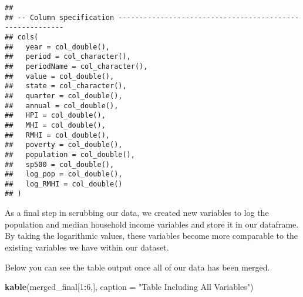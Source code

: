 \documentclass[
]{article}
\newenvironment{Shaded}{\begin{snugshade}}{\end{snugshade}}
\newcommand{\CommentTok}[1]{\textcolor[rgb]{0.56,0.35,0.01}{\textit{#1}}}
\newcommand{\DataTypeTok}[1]{\textcolor[rgb]{0.13,0.29,0.53}{#1}}
\newcommand{\DecValTok}[1]{\textcolor[rgb]{0.00,0.00,0.81}{#1}}
\newcommand{\KeywordTok}[1]{\textcolor[rgb]{0.13,0.29,0.53}{\textbf{#1}}}
\newcommand{\NormalTok}[1]{#1}
\newcommand{\OperatorTok}[1]{\textcolor[rgb]{0.81,0.36,0.00}{\textbf{#1}}}
\newcommand{\StringTok}[1]{\textcolor[rgb]{0.31,0.60,0.02}{#1}}
\begin{document}
\begin{verbatim}
## 
## -- Column specification ---------------------------------------------------------
## cols(
##   year = col_double(),
##   period = col_character(),
##   periodName = col_character(),
##   value = col_double(),
##   state = col_character(),
##   quarter = col_double(),
##   annual = col_double(),
##   HPI = col_double(),
##   MHI = col_double(),
##   RMHI = col_double(),
##   poverty = col_double(),
##   population = col_double(),
##   sp500 = col_double(),
##   log_pop = col_double(),
##   log_RMHI = col_double()
## )
\end{verbatim}

\begin{Shaded}
\end{Shaded}

As a final step in scrubbing our data, we created new variables to log
the population and median household income variables and store it in our
dataframe. By taking the logarithmic values, these variables become more
comparable to the existing variables we have within our dataset.

Below you can see the table output once all of our data has been merged.

\begin{Shaded}
\begin{Highlighting}[]
\KeywordTok{kable}\NormalTok{(merged_final[}\DecValTok{1}\OperatorTok{:}\DecValTok{6}\NormalTok{,], }\DataTypeTok{caption =} \StringTok{"Table Including All Variables"}\NormalTok{)}
\end{Highlighting}
\end{Shaded}
\end{document}
